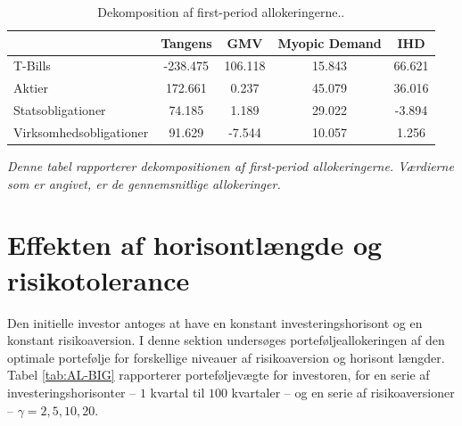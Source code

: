 \documentclass[
  a4paper,
  oneside]{memoir}
\begin{document}
\begin{table}[H]

\caption{\label{tab:AL-KOMP}Dekomposition af first-period allokeringerne..}
\centering
\begin{threeparttable}
\begin{tabular}[t]{lcccc}
\toprule
  & Tangens & GMV & Myopic Demand & IHD\\
\midrule
\rowcolor{gray!6}  T-Bills & -238.475 & 106.118 & 15.843 & 66.621\\
Aktier & 172.661 & 0.237 & 45.079 & 36.016\\
\rowcolor{gray!6}  Statsobligationer & 74.185 & 1.189 & 29.022 & -3.894\\
Virksomhedsobligationer & 91.629 & -7.544 & 10.057 & 1.256\\
\bottomrule
\end{tabular}
\begin{tablenotes}
\item \textit{Denne tabel rapporterer dekompositionen af first-period allokeringerne. Værdierne som er angivet, er de gennemsnitlige allokeringer.}
\end{tablenotes}
\end{threeparttable}
\end{table}

\hypertarget{effekten-af-horisontluxe6ngde-og-risikotolerance}{%
\section{Effekten af horisontlængde og risikotolerance}\label{effekten-af-horisontluxe6ngde-og-risikotolerance}}

Den initielle investor antoges at have en konstant investeringshorisont og en konstant risikoaversion. I denne sektion undersøges porteføljeallokeringen af den optimale portefølje for forskellige niveauer af risikoaversion og horisont længder. Tabel \ref{tab:AL-BIG} rapporterer porteføljevægte for investoren, for en serie af investeringshorisonter -- \(1\) kvartal til \(100\) kvartaler -- og en serie af risikoaversioner -- \(\gamma=2,5,10,20\).
\end{document}
